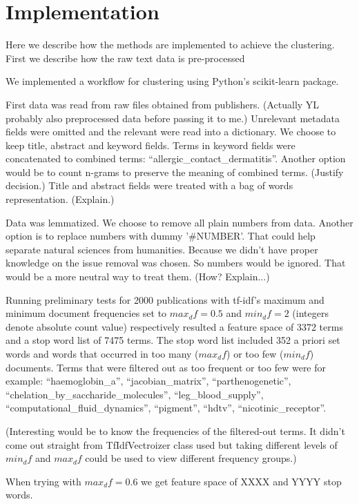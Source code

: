 \chapter{Implementation}
\label{chapter:implementation}
Here we describe how the methods are implemented to achieve the 
clustering. First we describe how the raw text data is 
pre-processed 

We implemented a workflow for clustering using Python's 
scikit-learn package. 

First data was read from raw files obtained from publishers. 
(Actually YL probably also preprocessed data before passing it to 
me.)
Unrelevant metadata fields were omitted and the relevant were read 
into a dictionary. We choose to keep title, abstract and keyword
fields. Terms in keyword fields were concatenated to combined 
terms: ``allergic\_contact\_dermatitis''. Another option would be to
count n-grams to preserve the meaning of combined terms. (Justify 
decision.) Title and abstract fields were treated with a bag of 
words representation. (Explain.)



Data was lemmatized. We choose to remove all plain numbers from
data. Another option is to replace numbers with dummy '\#NUMBER'.
That could help separate natural sciences from humanities. Because 
we didn't have proper knowledge on the issue removal was chosen. So 
numbers would be ignored. That would be a more neutral way to treat 
them. (How? Explain...)

Running preliminary tests for 2000 publications with tf-idf's maximum and 
minimum document frequencies set to $max_df=0.5$ 
and $min_df=2$ (integers denote absolute count value) respectively
resulted a feature space of 3372 terms and a stop word list of 7475 
terms. The stop word list included 352 a priori set words and words
that occurred in too many ($max_df$) or too few ($min_df$) 
documents. Terms that were filtered out as too frequent or too few
were for example: ``haemoglobin\_a'', ``jacobian\_matrix'', 
``parthenogenetic'', ``chelation\_by\_saccharide\_molecules'', 
``leg\_blood\_supply'', ``computational\_fluid\_dynamics'', 
``pigment'', ``hdtv'', ``nicotinic\_receptor''.

(Interesting would be to know the frequencies of the filtered-out 
terms. It didn't come out straight from TfIdfVectroizer class used 
but taking different levels of $min_df$ and $max_df$ could be used 
to view different frequency groups.)

When trying with $max_df=0.6$ we get feature space of XXXX and 
YYYY stop words.

